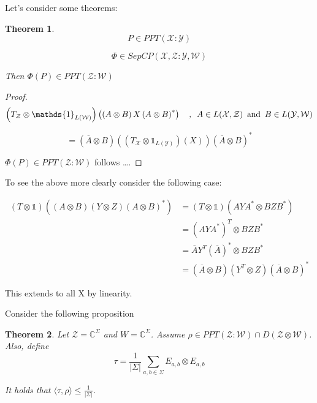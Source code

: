\documentclass{article}
\newtheorem{theorem}{Theorem}
\begin{document}
Let's consider some theorems:

\begin{theorem}
    \[P \in PPT(\mathcal{X}:\mathcal{Y})\]

    \[ 
        \Phi \in SepCP(\mathcal{X},\mathcal{Z}:\mathcal{Y},\mathcal{W})
    \]
    
    Then $\Phi(P) \in PPT(\mathcal{Z}:\mathcal{W})$
\end{theorem}

\begin{proof}
    \[
        \left( T_{\mathcal{Z}} \otimes \mathds{1}_{L(\mathcal{W})} \right) \left(
        \left( A \otimes B\right) X \left( A \otimes B \right)^* \right)
        \quad,\enskip A \in L(\mathcal{X},\mathcal{Z}) \enskip \text{and} \enskip
        B \in L(\mathcal{Y},\mathcal{W})
    \]

    \[ 
        = \left( \overline{A} \otimes B \right) \left( \left( T_{\mathcal{X}}
        \otimes \mathds{1}_{L(\mathcal{Y})} \right)\left( X \right) \right) 
        \left( \overline{A} \otimes B \right)^*
    \]

    $\Phi(P) \in PPT(\mathcal{Z}:\mathcal{W})$ follows \dots.
    
\end{proof}

To see the above more clearly consider the following case:

\begin{align*}
    \left( T \otimes \mathds{1} \right) \left( \left( A \otimes B \right) \left(
    Y \otimes Z\right) \left( A \otimes B \right)^* \right)
    &= \left( T \otimes \mathds{1} \right) \left( A Y A^* \otimes B Z B^* \right)\\
    &= \left( AYA^* \right)^T \otimes BZB^* \\
    &= \overline{A} Y^T \left( \overline{A} \right)^* \otimes B Z B^* \\
    &= \left( \overline{A} \otimes B \right) \left( Y^T \otimes Z \right) \left(
\overline{A} \otimes B\right)^*
\end{align*}

This extends to all X by linearity.

Consider the following proposition

\begin{theorem}
    Let $\mathcal{Z} = \mathbb{C}^\Sigma$ and $ W = \mathbb{C}^\Sigma $.
    Assume $\rho \in PPT(\mathcal{Z}: \mathcal{W}) \cap D(\mathcal{Z}\otimes
    \mathcal{W})$. Also, define
    \[
        \tau = \frac{1}{\left| \Sigma \right|} \sum_{a,b \in \Sigma} E_{a,b}
        \otimes E_{a,b}
    \]

    It holds that $\langle \tau , \rho \rangle \le \frac{1}{\left| \Sigma
    \right|}$.
\end{theorem}
\end{document}
